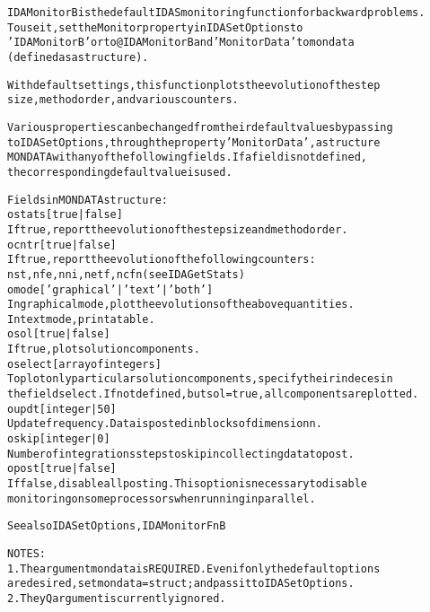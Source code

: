 \begin{alltt}
IDAMonitorB is the default IDAS monitoring function for backward problems.
   To use it, set the Monitor property in IDASetOptions to
   'IDAMonitorB' or to @IDAMonitorB and 'MonitorData' to mondata
   (defined as a structure).
  
   With default settings, this function plots the evolution of the step 
   size, method order, and various counters.
   
   Various properties can be changed from their default values by passing
   to IDASetOptions, through the property 'MonitorData', a structure
   MONDATA with any of the following fields. If a field is not defined, 
   the corresponding default value is used.

   Fields in MONDATA structure:
     o stats [ {true} | false ]
         If true, report the evolution of the step size and method order.
     o cntr [ {true} | false ]
         If true, report the evolution of the following counters:
         nst, nfe, nni, netf, ncfn (see IDAGetStats)
     o mode [ {'graphical'} | 'text' | 'both' ] 
         In graphical mode, plot the evolutions of the above quantities.
         In text mode, print a table.
     o sol  [ true | {false} ]
         If true, plot solution components.
     o select [ array of integers ]
         To plot only particular solution components, specify their indeces in
         the field select. If not defined, but sol=true, all components are plotted.
     o updt [ integer | {50} ]
         Update frequency. Data is posted in blocks of dimension n.
     o skip [ integer | {0} ]
         Number of integrations steps to skip in collecting data to post.
     o post [ {true} | false ]
         If false, disable all posting. This option is necessary to disable
         monitoring on some processors when running in parallel.

   See also IDASetOptions, IDAMonitorFnB

   NOTES:
     1. The argument mondata is REQUIRED. Even if only the default options
        are desired, set mondata=struct; and pass it to IDASetOptions.
     2. The yQ argument is currently ignored.
\end{alltt}






\vspace{0.1in}